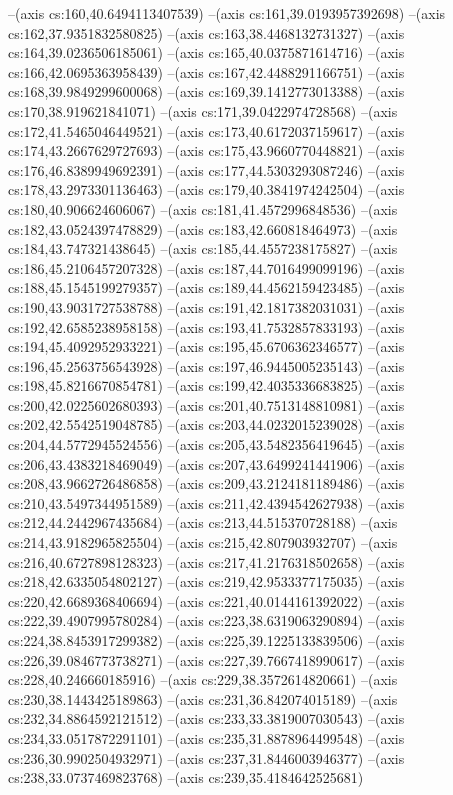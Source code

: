 --(axis cs:160,40.6494113407539)
--(axis cs:161,39.0193957392698)
--(axis cs:162,37.9351832580825)
--(axis cs:163,38.4468132731327)
--(axis cs:164,39.0236506185061)
--(axis cs:165,40.0375871614716)
--(axis cs:166,42.0695363958439)
--(axis cs:167,42.4488291166751)
--(axis cs:168,39.9849299600068)
--(axis cs:169,39.1412773013388)
--(axis cs:170,38.919621841071)
--(axis cs:171,39.0422974728568)
--(axis cs:172,41.5465046449521)
--(axis cs:173,40.6172037159617)
--(axis cs:174,43.2667629727693)
--(axis cs:175,43.9660770448821)
--(axis cs:176,46.8389949692391)
--(axis cs:177,44.5303293087246)
--(axis cs:178,43.2973301136463)
--(axis cs:179,40.3841974242504)
--(axis cs:180,40.906624606067)
--(axis cs:181,41.4572996848536)
--(axis cs:182,43.0524397478829)
--(axis cs:183,42.660818464973)
--(axis cs:184,43.747321438645)
--(axis cs:185,44.4557238175827)
--(axis cs:186,45.2106457207328)
--(axis cs:187,44.7016499099196)
--(axis cs:188,45.1545199279357)
--(axis cs:189,44.4562159423485)
--(axis cs:190,43.9031727538788)
--(axis cs:191,42.1817382031031)
--(axis cs:192,42.6585238958158)
--(axis cs:193,41.7532857833193)
--(axis cs:194,45.4092952933221)
--(axis cs:195,45.6706362346577)
--(axis cs:196,45.2563756543928)
--(axis cs:197,46.9445005235143)
--(axis cs:198,45.8216670854781)
--(axis cs:199,42.4035336683825)
--(axis cs:200,42.0225602680393)
--(axis cs:201,40.7513148810981)
--(axis cs:202,42.5542519048785)
--(axis cs:203,44.0232015239028)
--(axis cs:204,44.5772945524556)
--(axis cs:205,43.5482356419645)
--(axis cs:206,43.4383218469049)
--(axis cs:207,43.6499241441906)
--(axis cs:208,43.9662726486858)
--(axis cs:209,43.2124181189486)
--(axis cs:210,43.5497344951589)
--(axis cs:211,42.4394542627938)
--(axis cs:212,44.2442967435684)
--(axis cs:213,44.515370728188)
--(axis cs:214,43.9182965825504)
--(axis cs:215,42.807903932707)
--(axis cs:216,40.6727898128323)
--(axis cs:217,41.2176318502658)
--(axis cs:218,42.6335054802127)
--(axis cs:219,42.9533377175035)
--(axis cs:220,42.6689368406694)
--(axis cs:221,40.0144161392022)
--(axis cs:222,39.4907995780284)
--(axis cs:223,38.6319063290894)
--(axis cs:224,38.8453917299382)
--(axis cs:225,39.1225133839506)
--(axis cs:226,39.0846773738271)
--(axis cs:227,39.7667418990617)
--(axis cs:228,40.246660185916)
--(axis cs:229,38.3572614820661)
--(axis cs:230,38.1443425189863)
--(axis cs:231,36.842074015189)
--(axis cs:232,34.8864592121512)
--(axis cs:233,33.3819007030543)
--(axis cs:234,33.0517872291101)
--(axis cs:235,31.8878964499548)
--(axis cs:236,30.9902504932971)
--(axis cs:237,31.8446003946377)
--(axis cs:238,33.0737469823768)
--(axis cs:239,35.4184642525681)
